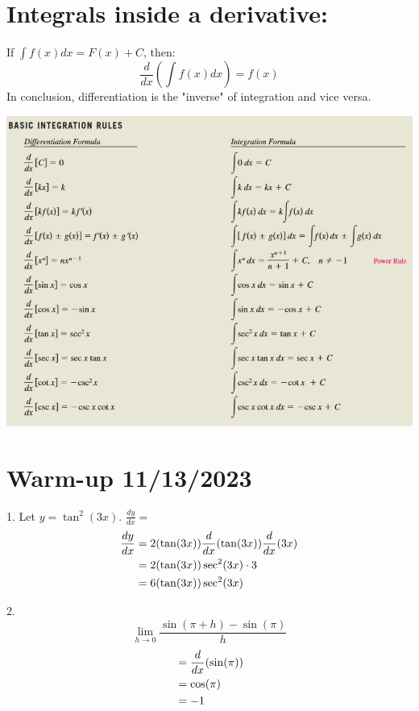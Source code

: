 \documentclass[11pt]{article}
\newcommand*{\set}{\setcounter{equation}{0}}
\begin{document}
\section{Integrals inside a derivative:}
If $\int f(x)dx=F(x)+C$, then:
\[\frac{d}{dx}\left(\int f(x)dx\right)=f(x)\]
In conclusion, differentiation is the "inverse" of integration and vice versa.\\
\begin{flushleft}
    \includegraphics[scale=0.9]{Integration.png}
\end{flushleft}

\section{Warm-up 11/13/2023}
1. Let $y=\tan^2(3x)$. $\frac{dy}{dx}=$
\begin{align}
    \set
    \frac{dy}{dx}&=2(\tan(3x))\frac{d}{dx}(\tan(3x))\frac{d}{dx}(3x)\\
    &=2(\tan(3x))\sec^2(3x)\cdot3\\
    &=6(\tan(3x))\sec^2(3x)
\end{align}

2.\[\lim_{h\to0}\frac{\sin(\pi+h)-\sin(\pi)}{h}\]
\begin{align}
    \set
    &=\frac{d}{dx}(\sin(\pi))\\
    &=\cos(\pi)\\
    &=-1
\end{align}
\end{document}
